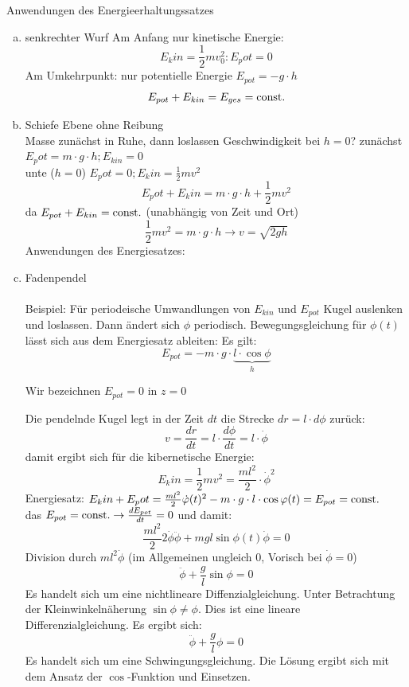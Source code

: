 \documentclass[a4paper,10pt]{scrartcl}
\begin{document}
\begin{seg}{Anwendungen des Energieerhaltungssatzes}
 \begin{enumerate}[a)]
  \item senkrechter Wurf
Am Anfang nur kinetische Energie:
\[
 E_kin=\frac{1}{2} m v_0^2: E_pot=0
\]
Am Umkehrpunkt:
nur potentielle Energie $E_{pot}=-g\cdot h$\\
\[
 E_{pot}+E_{kin}=E_{ges}=\text{const}.
\]
\item Schiefe Ebene ohne Reibung
\\
Masse zunächst in Ruhe, dann loslassen Geschwindigkeit bei $h=0$? zunächst $E_pot=m\cdot g\cdot h; E_{kin}=0$\\
unte ($h=0$) $E_pot=0; E_kin=\frac{1}{2} mv^2$
\[
 E_pot+E_kin=m\cdot g\cdot h+\frac{1}{2} m v^2
\]
da $E_{pot} +E_{kin}=\text{const}.$ (unabhängig von Zeit und Ort)
\[
 \frac{1}{2} mv^2=m\cdot g\cdot h\to v=\sqrt{2gh}
\]
Anwendungen des Energiesatzes:
\item Fadenpendel\\
\\
Beispiel: Für periodeische Umwandlungen von $E_{kin}$ und $E_{pot}$ Kugel auslenken und loslassen. Dann ändert sich $\phi$ periodisch.
Bewegungsgleichung für $\phi(t)$ lässt sich aus dem Energiesatz ableiten:
Es gilt: 
\[\boxed{E_{pot}=-m\cdot g\cdot \underbrace{l\cdot \cos{\phi}}_h}\]
\begin{df}[Energienullpunkt]
 Wir bezeichnen $E_{pot}=0$ in $z=0$
\end{df}
Die pendelnde Kugel legt in der Zeit $dt$ die Strecke $dr=l\cdot d\phi$ zurück:
\[
 v=\frac{dr}{dt}=l\cdot \frac{d\phi}{dt}=l\cdot \dot \phi
\]
damit ergibt sich für die kibernetische Energie:
\[
 \boxed{E_kin=\frac{1}{2}mv^2=\frac{ml^2}{2}\cdot \dot \phi^2}
\]
Energiesatz: $E_kin+E_pot=\frac{ml^2}{2}\dot {\varphi}(t)^2-m\cdot g\cdot l\cdot \cos{\varphi(t)}=E_{pot}=\text{const}.$\\
das $E_{pot}=\text{const}.\rightarrow \frac{dE_{pot}}{dt}=0$ und damit:
\[
 \frac{ml^2}{2}2\dot \phi \ddot \phi+mgl\sin\phi(t)\dot \phi=0
\]
Division durch $ml^2\dot \phi$ (im Allgemeinen ungleich $0$, Vorisch bei $\dot \phi=0$)\\
\[
 \boxed{\ddot\phi+\frac{g}{l}\sin\phi=0}
\]
Es handelt sich um eine nichtlineare Diffenzialgleichung. Unter Betrachtung der Kleinwinkelnäherung $\sin\phi\neq \phi$.  Dies ist eine lineare Differenzialgleichung. Es ergibt sich:
\[
 \boxed{\ddot \phi+\frac{g}{l}\phi=0}
\]
Es handelt sich um eine Schwingungsgleichung. Die Lösung ergibt sich mit dem Ansatz der $\cos$-Funktion und Einsetzen.\\

\end{enumerate}
\end{seg}
\end{document}
